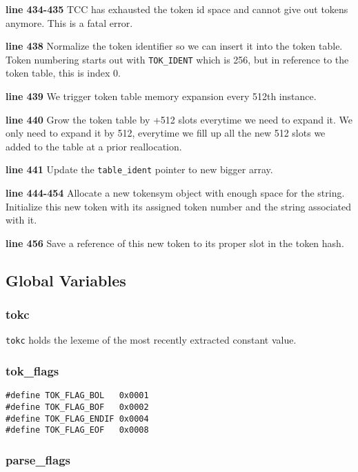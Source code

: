 \begin{tcc_desc}
\textbf{line 434-435} TCC has exhausted the token id space and cannot give out tokens anymore. This is a fatal error.

\textbf{line 438} Normalize the token identifier so we can insert it into the token table. Token numbering starts out with \verb|TOK_IDENT| which is 256, but in reference to the token table, this is index 0.

\textbf{line 439} We trigger token table memory expansion every 512th instance.

\textbf{line 440} Grow the token table by +512 slots everytime we need to expand it. We only need to expand it by 512, everytime we fill up all the new 512 slots we added to the table at a prior reallocation.

\textbf{line 441} Update the \verb|table_ident| pointer to new bigger array.

\textbf{line 444-454} Allocate a new tokensym object with enough space for the string. Initialize this new token with its assigned token number and the string associated with it.

\textbf{line 456} Save a reference of this new token to its proper slot in the token hash.
\end{tcc_desc}

\subsection{Global Variables}

\subsubsection{tokc}
\verb|tokc| holds the lexeme of the most recently extracted constant value.

\subsubsection{tok\_flags}

\begin{verbatim}
#define TOK_FLAG_BOL   0x0001
#define TOK_FLAG_BOF   0x0002
#define TOK_FLAG_ENDIF 0x0004
#define TOK_FLAG_EOF   0x0008
\end{verbatim}


\subsubsection{parse\_flags}


